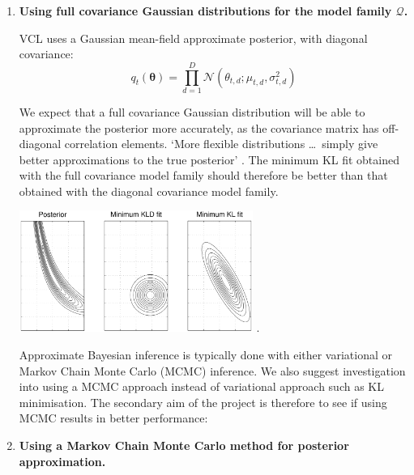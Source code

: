 \documentclass[a4paper,11pt]{article}
\let\boldtheta\theta %
\renewcommand{\theta}{\boldsymbol{\boldtheta}} %
\begin{document}
\begin{enumerate}
\item \textbf{Using full covariance Gaussian distributions for the model family $\mathcal{Q}$.}

VCL uses a Gaussian mean-field approximate posterior, with diagonal covariance: %
\[q_t(\theta) = \prod^D_{d=1} \mathcal{N}(\boldtheta_{t,d}; \mu_{t,d}, \sigma^2_{t,d})\]

We expect that a full covariance Gaussian distribution will be able to approximate the posterior more accurately, as the covariance matrix has off-diagonal correlation elements. `More flexible distributions \ldots\ simply give better approximations to the true posterior' \cite{ensemblelearning}. The minimum KL fit obtained with the full covariance model family should therefore be better than that obtained with the diagonal covariance model family.
\begin{center}
\includegraphics[width=0.6\textwidth]{approximations}
 .
 \label{figure:family}
\end{center}

\newpage

Approximate Bayesian inference is typically done with either variational or Markov Chain Monte Carlo (MCMC) inference. We also suggest investigation into using a MCMC approach instead of variational approach such as KL minimisation. The secondary aim of the project is therefore to see if using MCMC results in better performance:

\item \textbf{Using a Markov Chain Monte Carlo method for posterior approximation.}


\end{enumerate}
\end{document}
